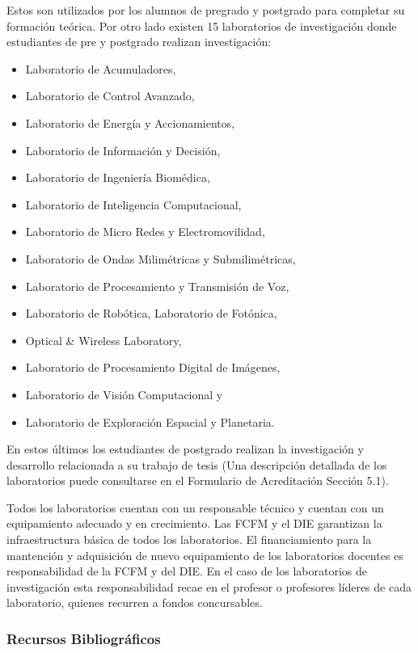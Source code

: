 Estos son utilizados por los alumnos de pregrado y postgrado para completar su formación teórica.
Por otro lado existen 15 laboratorios de investigación donde estudiantes de pre y postgrado
realizan investigación:

\begin{itemize}
\item Laboratorio de Acumuladores,
\item Laboratorio de Control Avanzado,
\item Laboratorio de Energía y Accionamientos,
\item Laboratorio de Información y Decisión,
\item Laboratorio de Ingeniería Biomédica,
\item Laboratorio de Inteligencia Computacional,
\item Laboratorio de Micro Redes y Electromovilidad,
\item Laboratorio de Ondas Milimétricas y Submilimétricas,
\item Laboratorio de Procesamiento y Transmisión de Voz,
\item Laboratorio de Robótica, Laboratorio de Fotónica,
\item Optical \& Wireless Laboratory,
\item Laboratorio de Procesamiento Digital de Imágenes,
\item Laboratorio de Visión Computacional y
\item Laboratorio de Exploración Espacial y Planetaria.
\end{itemize}

En estos últimos los estudiantes de postgrado realizan la investigación y desarrollo relacionada a su trabajo
de tesis (Una descripción detallada de los laboratorios puede consultarse en el Formulario de
Acreditación Sección 5.1).

Todos los laboratorios cuentan con un responsable técnico y cuentan con un equipamiento
adecuado y en crecimiento. Las FCFM y el DIE garantizan la infraestructura básica de todos los
laboratorios. El financiamiento para la mantención y adquisición de nuevo equipamiento de los
laboratorios docentes es responsabilidad de la FCFM y del DIE. En el caso de los laboratorios
de investigación esta responsabilidad recae en el profesor o profesores líderes de cada laboratorio,
quienes recurren a fondos concursables.

\subsubsection{Recursos Bibliográficos}

